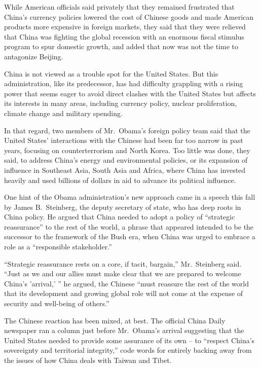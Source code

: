 ﻿\documentclass[12pt]{article}
\begin{document}
While American officials said privately that they remained frustrated that China's currency policies
lowered the cost of Chinese goods and made American products more expensive in foreign markets, they
said that they were relieved that China was fighting the global recession with an enormous fiscal
stimulus program to spur domestic growth, and added that now was not the time to antagonize Beijing.

China is not viewed as a trouble spot for the United States. But this administration, like its
predecessor, has had difficulty grappling with a rising power that seems eager to avoid direct
clashes with the United States but affects its interests in many areas, including currency policy,
nuclear proliferation, climate change and military spending.

In that regard, two members of Mr.~Obama's foreign policy team said that the United States'
interactions with the Chinese had been far too narrow in past years, focusing on counterterrorism
and North Korea. Too little was done, they said, to address China's energy and environmental
policies, or its expansion of influence in Southeast Asia, South Asia and Africa, where China has
invested heavily and used billions of dollars in aid to advance its political influence.

One hint of the Obama administration's new approach came in a speech this fall by James
B.~Steinberg, the deputy secretary of state, who has deep roots in China policy. He argued that
China needed to adopt a policy of ``strategic reassurance'' to the rest of the world, a phrase that
appeared intended to be the successor to the framework of the Bush era, when China was urged to
embrace a role as a ``responsible stakeholder.''

``Strategic reassurance rests on a core, if tacit, bargain,'' Mr.~Steinberg said. ``Just as we and
our allies must make clear that we are prepared to welcome China's 'arrival,' '' he argued, the
Chinese ``must reassure the rest of the world that its development and growing global role will not
come at the expense of security and well-being of others.''

The Chinese reaction has been mixed, at best. The official China Daily newspaper ran a column just
before Mr.~Obama's arrival suggesting that the United States needed to provide some assurance of its
own -- to ``respect China's sovereignty and territorial integrity,'' code words for entirely backing
away from the issues of how China deals with Taiwan and Tibet.
\end{document}
